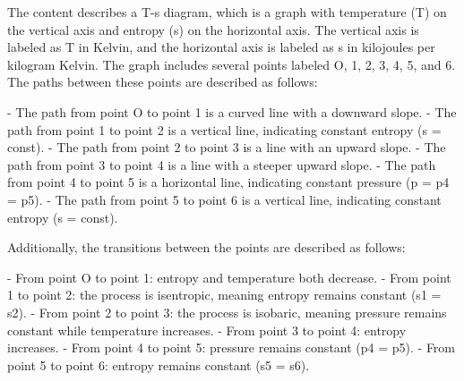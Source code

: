 The content describes a T-s diagram, which is a graph with temperature (T) on the vertical axis and entropy (s) on the horizontal axis. The vertical axis is labeled as T in Kelvin, and the horizontal axis is labeled as s in kilojoules per kilogram Kelvin. The graph includes several points labeled O, 1, 2, 3, 4, 5, and 6. The paths between these points are described as follows:

- The path from point O to point 1 is a curved line with a downward slope.
- The path from point 1 to point 2 is a vertical line, indicating constant entropy (s = const).
- The path from point 2 to point 3 is a line with an upward slope.
- The path from point 3 to point 4 is a line with a steeper upward slope.
- The path from point 4 to point 5 is a horizontal line, indicating constant pressure (p = p4 = p5).
- The path from point 5 to point 6 is a vertical line, indicating constant entropy (s = const).

Additionally, the transitions between the points are described as follows:

- From point O to point 1: entropy and temperature both decrease.
- From point 1 to point 2: the process is isentropic, meaning entropy remains constant (s1 = s2).
- From point 2 to point 3: the process is isobaric, meaning pressure remains constant while temperature increases.
- From point 3 to point 4: entropy increases.
- From point 4 to point 5: pressure remains constant (p4 = p5).
- From point 5 to point 6: entropy remains constant (s5 = s6).